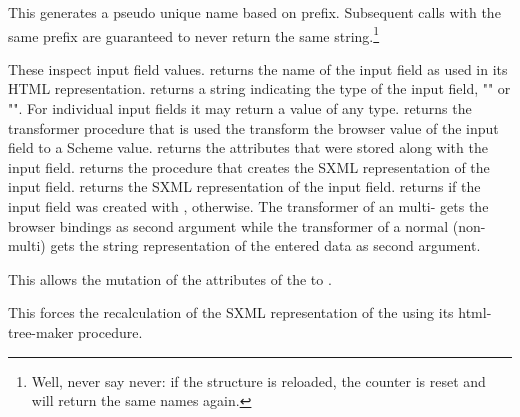 \begin{desc}
  This generates a pseudo unique name based on prefix.  Subsequent
  calls with the same prefix are guaranteed to never return the same
  string.\footnote{Well, never say never:  if the structure is
  reloaded, the counter is reset and 
  will return the same names again.} 
\end{desc}


\begin{desc}
  These inspect input field values.   returns the
  name of the input field as used in its HTML representation.
   returns a string indicating the type of the
  input field, \eg "" or "".  For individual input
  fields it may return a value of any type.
   returns the transformer procedure that
  is used the transform the browser value of the input field to a
  Scheme value.   returns the attributes
  that were stored along with the input field.
   returns the procedure that creates
  the SXML representation of the input field.
   returns the SXML representation of the
  input field.   returns \sharpt if the input
  field was created with , \sharpf
  otherwise.  The transformer of an multi- gets the
  browser bindings as second argument while the transformer of a
  normal (non-multi)  gets the string representation
  of the entered data as second argument.
\end{desc}


\begin{desc}
  This allows the mutation of the attributes of the 
  to .
\end{desc}

\begin{desc}
  This forces the recalculation of the SXML representation of the
   using its html-tree-maker procedure.
\end{desc}


